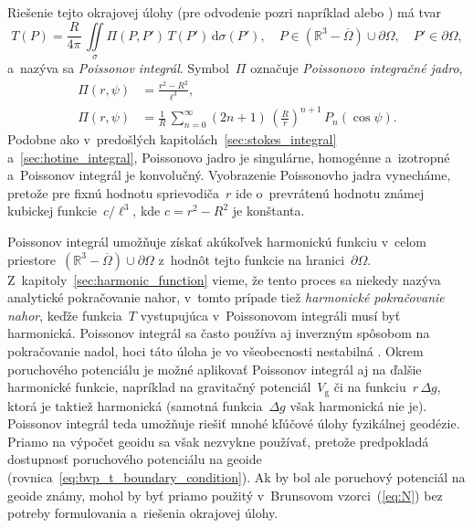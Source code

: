 \documentclass[a4paper, 12pt]{book}
\newcommand{\diff}{\mathrm d}
\newcommand{\gidx}{\mathrm g}
\begin{document}
Riešenie tejto okrajovej úlohy (pre odvodenie pozri napríklad 
\cite{MoritzPhysicalGeodesy} alebo \cite{SansoGeoidDetermination}) má tvar
%
\begin{equation}
\label{eq:poisson}
T(P) = \frac{R}{4\pi} \, \iint\limits_\sigma \Pi(P, P') \, T(P') \, 
\diff\sigma(P'){,} \quad P \in \left( \mathbb{R}^3 - \overline\Omega \right) 
\cup \partial\Omega{,} \quad P' \in \partial\Omega{,}
\end{equation}
%
a~nazýva sa \emph{Poissonov integrál}.  Symbol~$\Pi$ označuje \emph{Poissonovo 
integračné jadro},
%
\begin{align}
\Pi(r, \psi) &= \frac{r^2 - R^2}{\ell^3}{,}\label{eq:poisson_kernel}\\
\Pi(r, \psi) &= \frac{1}{R} \, \sum_{n = 0}^{\infty} (2n + 1) \, \left( 
\frac{R}{r} \right)^{n + 1} \, 
P_n(\cos\psi)\label{eq:poisson_kernel_spectral}{.}
\end{align}
%
Podobne ako v~predošlých kapitolách~\ref{sec:stokes_integral} 
a~\ref{sec:hotine_integral}, Poissonovo jadro je singulárne, homogénne 
a~izotropné a~Poissonov integrál je konvolučný.  Vyobrazenie Poissonovho jadra 
vynecháme, pretože pre fixnú hodnotu sprievodiča~$r$ ide o~prevrátenú hodnotu 
známej kubickej funkcie~$c \slash \ell^3$, kde $c = r^2 - R^2$ je konštanta.

Poissonov integrál umožňuje získať akúkoľvek harmonickú funkciu v~celom 
priestore~$\left( \mathbb{R}^3 - \overline\Omega \right) \cup \partial\Omega$ 
z~hodnôt tejto funkcie na hranici~$\partial\Omega$.  
Z~kapitoly~\ref{sec:harmonic_function} vieme, že tento proces sa niekedy nazýva 
analytické pokračovanie nahor, v~tomto prípade tiež \emph{harmonické 
pokračovanie nahor}, keďže funkcia~$T$ vystupujúca v~Poissonovom integráli musí 
byť harmonická.  Poissonov integrál sa často používa aj inverzným spôsobom na 
pokračovanie nadol, hoci táto úloha je vo všeobecnosti nestabilná 
\parencite{SansoGeodeticBoundaryValueProblem}.  Okrem poruchového potenciálu je 
možné aplikovať Poissonov integrál aj na ďalšie harmonické funkcie, napríklad 
na gravitačný potenciál~$V_\gidx$ či na funkciu~$r \, \Delta g$, ktorá je 
taktiež harmonická (samotná funkcia~$\Delta g$ však harmonická nie je).  
Poissonov integrál teda umožňuje riešiť mnohé kľúčové úlohy fyzikálnej 
geodézie.  Priamo na výpočet geoidu sa však nezvykne používať, pretože 
predpokladá dostupnosť poruchového potenciálu na geoide 
(rovnica~\ref{eq:bvp_t_boundary_condition}).  Ak by bol ale poruchový potenciál 
na geoide známy, mohol by byť priamo použitý v~Brunsovom vzorci~(\ref{eq:N}) 
bez potreby formulovania a~riešenia okrajovej úlohy.
\end{document}
